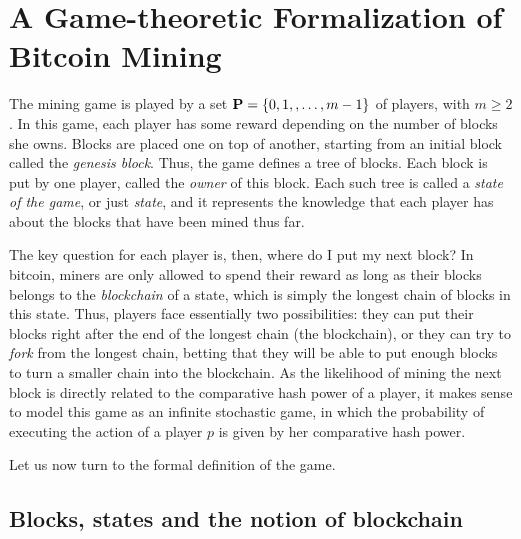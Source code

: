 
\section{A Game-theoretic Formalization of Bitcoin Mining}
\label{sec-formalization}

The mining game is played by a set $\mathbf{P} = \{0, 1, , \ldots, m-1\}$ of players, with $m \geq 2$.
In this game, each player has some reward depending on the number of blocks she owns. Blocks are placed one on top of another, starting from an initial block called the {\em genesis block}. Thus, the game defines a tree of blocks. Each block is put by one player, called the {\em owner} of this block. Each such tree is called a {\em state of the game}, or just {\em state}, and it represents the knowledge that each player has about the blocks that have been mined thus far. 

The key question for each player is, then, where do I put my next block? In bitcoin, miners are only allowed to spend their reward as long 
as their blocks belongs to the \emph{blockchain} of a state, which is simply the longest chain of blocks in this state. Thus, players face essentially two possibilities: they can put their blocks right after the end of the longest chain (the blockchain), or they can try to \emph{fork} 
from the longest chain, betting that they will be able to put enough blocks to turn a smaller chain into the blockchain. As the likelihood of 
mining the next block is directly related to the comparative hash power of a player, it makes sense to model this game as an infinite 
stochastic game, in which the probability of executing the action of a player $p$ is given by her comparative hash power. 

Let us now turn to the formal definition of the game. 


\subsection{Blocks, states and the notion of blockchain}

